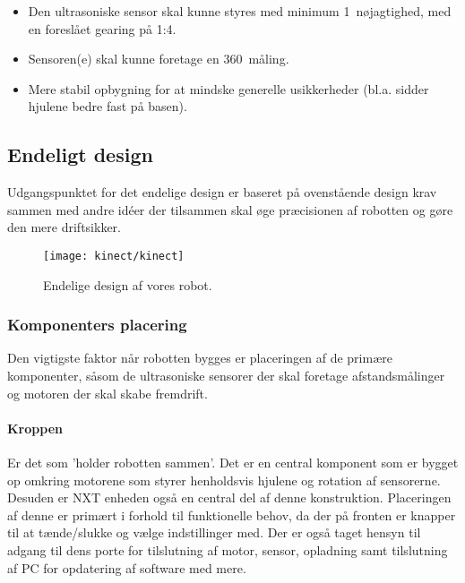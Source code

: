 \begin{itemize}
\item Den ultrasoniske sensor skal kunne styres med  minimum 1\degree~nøjagtighed, med en foreslået gearing på 1:4.
\item Sensoren(e) skal kunne foretage en 360\degree~måling.
\item Mere stabil opbygning for at mindske generelle usikkerheder (bl.a. sidder hjulene bedre fast på basen).
\end{itemize} 


\subsection{Endeligt design}
Udgangspunktet for det endelige design er baseret på ovenstående design krav sammen med andre idéer der tilsammen skal øge præcisionen af robotten og gøre den mere driftsikker.

\begin{figure}
\centering
\texttt{[image: kinect/kinect]}
\caption{Endelige design af vores robot.}
\label{robot:opbygning}
\end{figure}

\subsubsection{Komponenters placering}

Den vigtigste faktor når robotten bygges er placeringen af de primære komponenter, såsom de ultrasoniske sensorer der skal foretage afstandsmålinger og motoren der skal skabe fremdrift.

\paragraph{Kroppen}
Er det som 'holder robotten sammen'.
Det er en central komponent som er bygget op omkring motorene som styrer henholdsvis hjulene og rotation af sensorerne.
Desuden er NXT enheden også en central del af denne konstruktion.
Placeringen af denne er primært i forhold til funktionelle behov, da der på fronten er knapper til at tænde/slukke og vælge indstillinger med.
Der er også taget hensyn til adgang til dens porte for tilslutning af motor, sensor, opladning samt tilslutning af PC for opdatering af software med mere.

